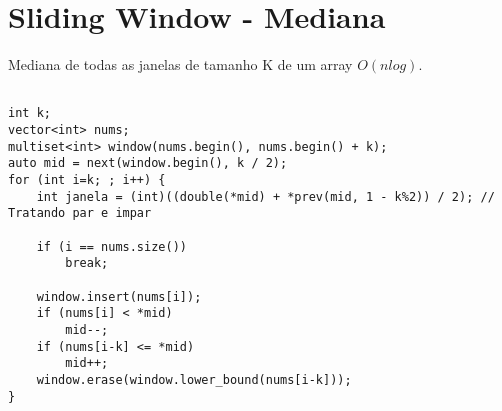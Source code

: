 \section{Sliding Window - Mediana}
Mediana de todas as janelas de tamanho K de um array $O(nlog)$.
\begin{multicols}{2}
	\begin{lstlisting}

int k;
vector<int> nums;
multiset<int> window(nums.begin(), nums.begin() + k);
auto mid = next(window.begin(), k / 2);
for (int i=k; ; i++) {	
	int janela = (int)((double(*mid) + *prev(mid, 1 - k%2)) / 2); // Tratando par e impar
	
	if (i == nums.size())
		break;
	
	window.insert(nums[i]);
	if (nums[i] < *mid)
		mid--;
	if (nums[i-k] <= *mid)
		mid++;
	window.erase(window.lower_bound(nums[i-k]));
}

\end{lstlisting}
\end{multicols}


